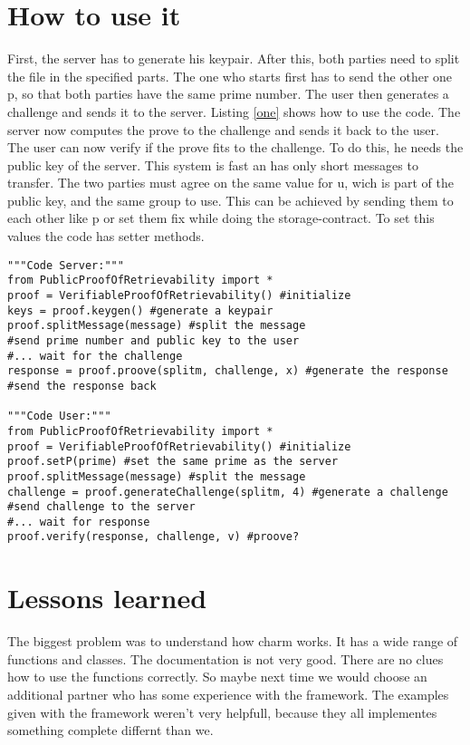 \documentclass{amsart}
\begin{document}
\section{How to use it}
First, the server has to generate his keypair. After this, both parties need to split the file in the specified parts. The one who starts first has to send the other one p, so that both parties have the same prime number. The user then generates a challenge and sends it to the server. Listing \ref{one} shows how to use the code. The server now computes the prove to the challenge and sends it back to the user. The user can now verify if the prove fits to the challenge. To do this, he needs the public key of the server. This system is fast an has only short messages to transfer. The two parties must agree on the same value for u, wich is part of the public key, and the same group to use. This can be achieved by sending them to each other like p or set them fix while doing the storage-contract. To set this values the code has setter methods.
\lstset{
	breaklines=true,
	language=Python,
	frame=single,
	numbers=left,
	numbersep=5pt
}
\begin{lstlisting}[caption=How to Use Code, label=one]
"""Code Server:"""
from PublicProofOfRetrievability import *
proof = VerifiableProofOfRetrievability() #initialize
keys = proof.keygen() #generate a keypair
proof.splitMessage(message) #split the message
#send prime number and public key to the user
#... wait for the challenge
response = proof.proove(splitm, challenge, x) #generate the response
#send the response back

"""Code User:"""
from PublicProofOfRetrievability import *
proof = VerifiableProofOfRetrievability() #initialize
proof.setP(prime) #set the same prime as the server
proof.splitMessage(message) #split the message
challenge = proof.generateChallenge(splitm, 4) #generate a challenge
#send challenge to the server
#... wait for response
proof.verify(response, challenge, v) #proove?
\end{lstlisting}

\section{Lessons learned}
The biggest problem was to understand how charm works. It has a wide range of functions and classes. The documentation is not very good. There are no clues how to use the functions correctly. So maybe next time we would choose an additional partner who has some experience with the framework. The examples given with the framework weren't very helpfull, because they all implementes something complete differnt than we.
\end{document}

